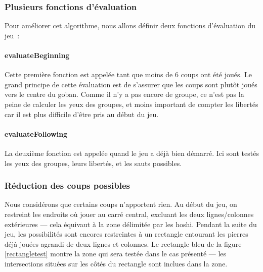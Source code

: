 \documentclass[11pt,a4paper,titlepage,french]{article}
\begin{document}
			\subsubsection{Plusieurs fonctions d'évaluation}
				Pour améliorer cet algorithme, nous allons définir deux fonctions d'évaluation du jeu~:

				\paragraph{evaluateBeginning}
					Cette première fonction est appelée tant que moins de 6 coups ont été joués. Le grand principe de cette évaluation est de s'assurer que les coups sont plutôt joués vers le centre du goban. Comme il n'y a pas encore de groupe, ce n'est pas la peine de calculer les yeux des groupes, et moins important de compter les libertés car il est plus difficile d'être pris au début du jeu.


				\paragraph{evaluateFollowing}
					La deuxième fonction est appelée quand le jeu a déjà bien démarré. Ici sont testés les yeux des groupes, leurs libertés, et les sauts possibles.

			\subsubsection{Réduction des coups possibles}
				Nous considérons que certains coups n'apportent rien. Au début du jeu, on restreint les endroits où jouer au carré central, excluant les deux lignes/colonnes extérieures --- cela équivaut à la zone délimitée par les hoshi. Pendant la suite du jeu, les possibilités  sont encores restreintes à un rectangle entourant les pierres déjà jouées agrandi de deux lignes et colonnes. Le rectangle bleu de la figure \ref{rectangletest} montre la zone qui sera testée dans le cas présenté --- les intersections situées sur les côtés du rectangle sont inclues dans la zone.
\end{document}
